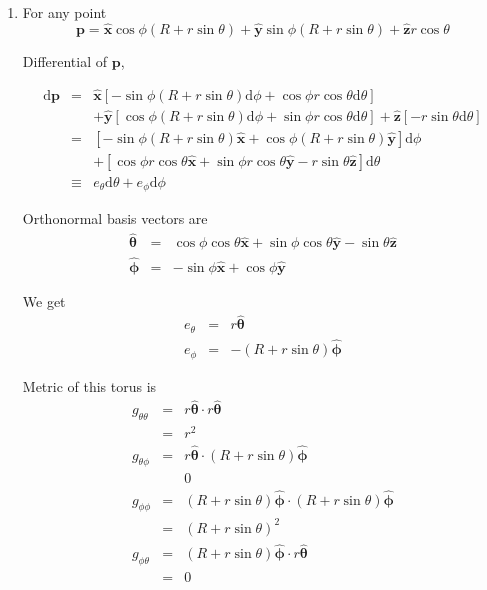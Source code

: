 \documentclass[12pt,a4paper]{article}
\begin{document}
\begin{enumerate}
\item

For any point
\begin{equation*}
	\bm p = \bm{\hat x} \cos\phi (R + r\sin\theta) + \bm{\hat y} \sin\phi(R + r\sin\theta) + \bm{\hat z} r\cos\theta
\end{equation*}

Differential of $\bm p$,

\begin{eqnarray*}
	\mathrm d \bm p &=& \bm{\hat x} [ -\sin\phi(R + r\sin\theta) \mathrm d\phi + \cos\phi r \cos\theta \mathrm d\theta  ] \\
	&& + \bm{\hat y} [ \cos\phi (R+r\sin\theta) \mathrm d\phi + \sin\phi r \cos\theta \mathrm d\theta  ]   + \bm{\hat z} [ - r\sin\theta \mathrm d\theta] \\
	&=&[ -\sin\phi (R+r\sin\theta) \bm{\hat x} + \cos\phi (R+r\sin\theta)\bm{\hat y}  ]\mathrm d\phi \\
	&& + [ \cos\phi r \cos\theta \bm{\hat x} + \sin\phi r\cos\theta \bm{\hat y} - r\sin\theta \bm{\hat z} ]\mathrm d\theta \\
	&\equiv& e_\theta \mathrm d\theta + e_{\phi} \mathrm d\phi
\end{eqnarray*}

Orthonormal basis vectors are
\begin{eqnarray*}
	\bm{\hat \theta} &=& \cos\phi\cos\theta \bm{\hat x} + \sin\phi\cos\theta \bm{\hat y} - \sin\theta \bm{\hat z} \\
	\bm{\hat \phi} &=& - \sin\phi \bm{\hat x} + \cos\phi \bm{\hat y}
\end{eqnarray*}

We get
\begin{eqnarray*}
	e_{\theta} &=& r \bm{\hat \theta}\\
	e_{\phi}&=& - (R+r\sin\theta) \bm{\hat \phi}
\end{eqnarray*}

Metric of this torus is
\begin{eqnarray*}
	g_{\theta\theta} &=& r\bm{\hat \theta}\cdot r \bm{\hat \theta}\\
	&=& r^2 \\
	g_{\theta\phi}&=& r\bm{\hat \theta}\cdot (R+r\sin\theta)\bm{\hat\phi} \\
	&& 0 \\
	g_{\phi\phi}&=& (R+r\sin\theta) \bm{\hat \phi}\cdot (R+r\sin\theta)\bm{\hat \phi}\\
	&=& (R+r\sin\theta)^2 \\
	g_{\phi\theta}&=&  (R+r\sin\theta)\bm{\hat \phi} \cdot  r\bm{\hat\theta}\\
	&=& 0
\end{eqnarray*}


\end{enumerate}
\end{document}
